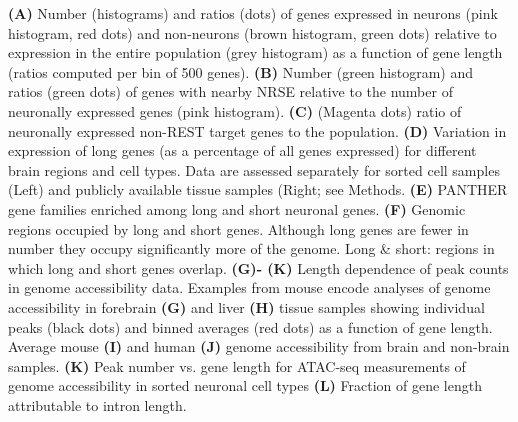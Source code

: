 \textbf{(A)} Number (histograms) and ratios (dots) of genes expressed in neurons (pink histogram, red dots) and non-neurons (brown histogram, green dots) relative to expression in the entire population (grey histogram) as a function of gene length (ratios computed per bin of 500 genes). 
\textbf{(B)} Number (green histogram) and ratios (green dots) of genes with nearby NRSE relative to the number of neuronally expressed genes (pink histogram). 
\textbf{(C)} (Magenta dots) ratio of neuronally expressed non-REST target genes to the population.
\textbf{(D)} Variation in expression of long genes (as a percentage of all genes expressed) for different brain regions and cell types. Data are assessed separately for sorted cell samples (Left) and publicly available tissue samples (Right; see Methods.
\textbf{(E)} PANTHER gene families enriched among long and short neuronal genes. 
\textbf{(F)} Genomic regions occupied by long and short genes. Although long genes are fewer in number they occupy significantly more of the genome. Long & short: regions in which long and short genes overlap. 
\textbf{(G)- (K)} Length dependence of peak counts in genome accessibility data.
Examples from mouse encode analyses of genome accessibility in forebrain \textbf{(G)} and liver \textbf{(H)} tissue samples showing individual peaks (black dots) and binned averages (red dots) as a function of gene length. Average mouse \textbf{(I)} and human \textbf{(J)} genome accessibility from brain and non-brain samples.
\textbf{(K)} Peak number vs. gene length for ATAC-seq measurements of genome accessibility in sorted neuronal cell types
\textbf{(L)} Fraction of gene length attributable to intron length.